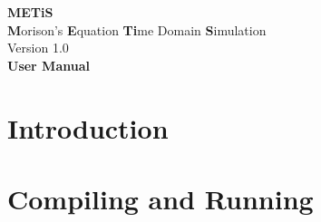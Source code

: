\documentclass[12pt]{report}
\begin{document}
\begin{titlepage}
	\vspace*{5cm}
    \begin{center}
%
		{\Huge {}\selectfont \textbf{METiS}} \\[15pt]		
		{\LARGE {}\selectfont \textbf{M}orison's \textbf{E}quation \textbf{Ti}me Domain \textbf{S}imulation} \\[20pt]
		\vspace*{\fill}
%
%		
		{\LARGE {}\selectfont Version 1.0} \\[8pt]		
		{\huge {}\selectfont \textbf{User Manual}}		
    \end{center} 
    \vspace*{1cm}
\end{titlepage}



\tableofcontents

\chapter{Introduction}

\chapter{Compiling and Running}
\end{document}
